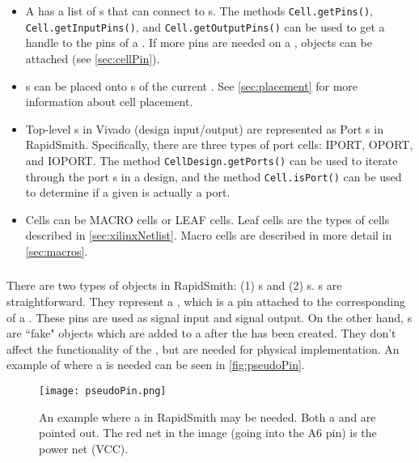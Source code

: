 \begin {itemize}
  \item A  has a list of s that can connect to
  s. The methods \texttt{Cell.getPins()},
  \texttt{Cell.getInputPins()}, and \texttt{Cell.getOutputPins()} can be used to
  get a handle to the pins of a . If more pins are
  needed on a ,  objects can be attached (see
  \autoref{sec:cellPin}). \item {}s can be placed onto s of the
  current . See \autoref{sec:placement} for more information about
  cell placement.
  \item Top-level s in Vivado (design input/output) are represented as
  Port s in RapidSmith. Specifically, there are three types of port cells: IPORT, 
  OPORT, and IOPORT. The method \texttt{CellDesign.getPorts()} can
  be used to iterate through the port s in a design, and the method
  \texttt{Cell.isPort()} can be used to determine if a given  is
  actually a port.
  \item Cells can be MACRO cells or LEAF cells. Leaf cells are the types of
  cells described in \autoref{sec:xilinxNetlist}. Macro cells are described in
  more detail in \autoref{sec:macros}.
\end{itemize}

\subsubsection{} \label{sec:cellPin}

There are two types of  objects in RapidSmith:
(1) s and (2) s. s are
straightforward. They represent a , which is a pin attached
to the corresponding  of a . These pins are used as
signal input and signal output. On the other hand, s are
``fake"  objects which are added to a  after
the  has been created. They don't affect the functionality of the
, but are needed for physical implementation. An example of where a
 is needed can be seen in \autoref{fig:pseudoPin}.

\begin{figure}[H]
 \centering
 \texttt{[image: pseudoPin.png]}
 \caption{An example where a  in RapidSmith may be needed.
 Both a  and  are pointed out. The red net
 in the image (going into the A6 pin) is the power net (VCC).}
 \label{fig:pseudoPin}
\end{figure}

